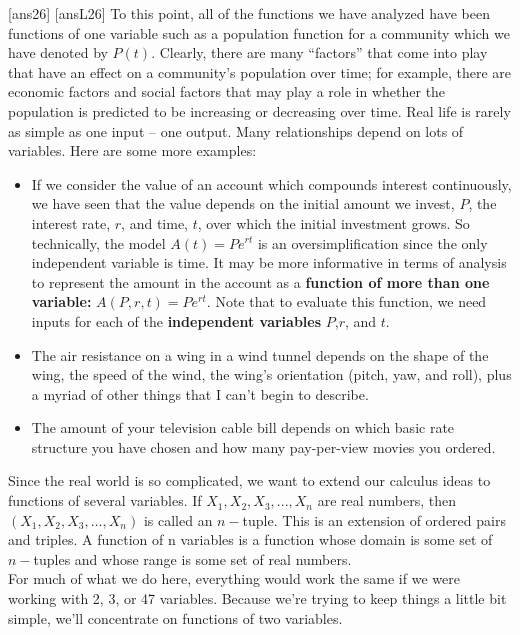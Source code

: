 \newpage
[ans26]
[ansL26]
\noindent To this point, all of the functions we have analyzed have been functions of one variable such as a population function for a community which we have denoted by $P(t)$. Clearly, there are many “factors” that come into play that have an effect on a community’s population over time; for example, there are economic factors and social factors that may play a role in whether the population is predicted to be increasing or decreasing over time. Real life is rarely as simple as one input – one output. Many relationships depend on lots of variables. Here are some more examples: \\
\begin{itemize}[leftmargin=*]
    \item If we consider the value of an account which compounds interest continuously, we have seen that the value depends on the initial amount we invest, $P$, the interest rate, $r$, and time, $t$, over which the initial investment grows.  So technically, the model $A(t)=Pe^{rt}$ is an oversimplification since the only independent variable is time.  It may be more informative in terms of analysis to represent the amount in the account as a \textbf{function of more than one variable:}  $A(P,r,t)=Pe^{rt}$.  Note that to evaluate this function, we need inputs for each of the \textbf{independent variables} $P$,$r$, and $t$.
    \item The air resistance on a wing in a wind tunnel depends on the shape of the wing, the speed of the wind, the wing’s orientation (pitch, yaw, and roll), plus a myriad of other things that I can’t begin to describe.
    \item The amount of your television cable bill depends on which basic rate structure you have chosen and how many pay-per-view movies you ordered.
\end{itemize}
\noindent Since the real world is so complicated, we want to extend our calculus ideas to functions of several variables. If $X_1, X_2, X_3,..., X_n$ are real numbers, then $\left(X_1, X_2, X_3,..., X_n\right)$ is called an $n-$tuple. This is an extension of ordered pairs and triples. A function of n variables is a function whose domain is some set of $n-$tuples and whose range is some set of real numbers. \\
\noindent For much of what we do here, everything would work the same if we were working with 2, 3, or 47 variables. Because we’re trying to keep things a little bit simple, we’ll concentrate on functions of two variables.

